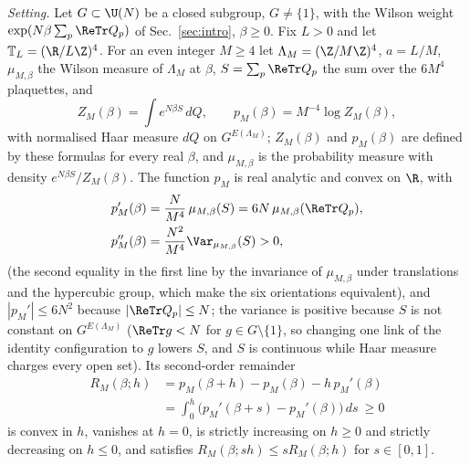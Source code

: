 \emph{Setting.} Let $G\subset\U(N)$ be a closed subgroup, $G\ne\{1\}$, with
the Wilson weight $\exp(N\beta\sum_p\ReTr Q_p)$ of Sec.~\ref{sec:intro},
$\beta\ge0$.
Fix $L>0$ and let $\mathbb T_L=(\R/L\Z)^4$. For an even integer $M\ge4$ let
$\Lambda_M=(\Z/M\Z)^4$, $a=L/M$, $\mu_{M,\beta}$ the Wilson measure of
$\Lambda_M$ at $\beta$, $S=\sum_p\ReTr Q_p$ the sum over the $6M^4$
plaquettes, and
\[
Z_M(\beta)=\int e^{N\beta S}\,dQ,\qquad p_M(\beta)=M^{-4}\log Z_M(\beta),
\]
with normalised Haar measure $dQ$ on $G^{E(\Lambda_M)}$; $Z_M(\beta)$ and
$p_M(\beta)$ are defined by these formulas for every real $\beta$, and
$\mu_{M,\beta}$ is the probability measure with density $e^{N\beta S}/Z_M(\beta)$.
The function $p_M$ is real analytic and convex on $\R$, with
\begin{align*}
p_M'(\beta)&=\frac N{M^4}\,\mu_{M,\beta}(S)=6N\,\mu_{M,\beta}(\ReTr Q_p),\\
p_M''(\beta)&=\frac{N^2}{M^4}\Var_{\mu_{M,\beta}}(S)>0,
\end{align*}
(the second equality in the first line by the invariance of $\mu_{M,\beta}$
under translations and the hypercubic group, which make the six
orientations equivalent), and $|p_M'|\le6N^2$ because $|\ReTr Q_p|\le N$; the
variance is positive
because $S$ is not constant on $G^{E(\Lambda_M)}$ ($\ReTr g<N$ for $g\in
G\setminus\{1\}$, so changing one link of the identity configuration to $g$
lowers $S$, and $S$ is continuous while Haar measure charges every open
set). Its second-order remainder
\begin{align*}
R_M(\beta;h)&=p_M(\beta+h)-p_M(\beta)-h\,p_M'(\beta)\\
&=\int_0^h\bigl(p_M'(\beta+s)-p_M'(\beta)\bigr)\,ds\ \ge0
\end{align*}
is convex in $h$, vanishes at $h=0$, is strictly increasing on $h\ge0$ and
strictly decreasing on $h\le0$, and satisfies $R_M(\beta;sh)\le sR_M(\beta;h)$
for $s\in[0,1]$.

